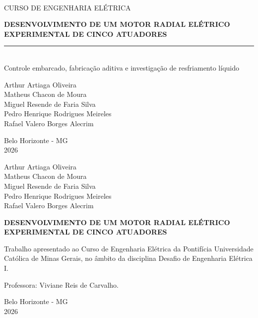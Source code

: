 \documentclass[12pt,a4paper,oneside]{article}
\begin{document}
\hypersetup{pageanchor=false}

\begin{titlepage}
  \pagecolor{navy}\color{white}
  \\[0.25cm]
  {\large CURSO DE ENGENHARIA ELÉTRICA}

  \vspace{3.2cm}
  {\fontsize{25}{31}\selectfont\bfseries
  DESENVOLVIMENTO DE UM MOTOR RADIAL ELÉTRICO EXPERIMENTAL DE CINCO ATUADORES\par}

  \vspace{0.8cm}
  {\color{orange}\rule{0.48\textwidth}{2.2pt}}\\[0.8cm]
  {\large Controle embarcado, fabricação aditiva e investigação de resfriamento líquido}

  \vfill
  {\normalsize
  Arthur Artiaga Oliveira\\
  Matheus Chacon de Moura\\
  Miguel Resende de Faria Silva\\
  Pedro Henrique Rodrigues Meireles\\
  Rafael Valero Borges Alecrim}

  \vspace{1.2cm}
  {\normalsize Belo Horizonte - MG\\2026}
\end{titlepage}
\nopagecolor\color{dark}

\begin{titlepage}
  \begin{center}
    {\normalsize
    Arthur Artiaga Oliveira\\
    Matheus Chacon de Moura\\
    Miguel Resende de Faria Silva\\
    Pedro Henrique Rodrigues Meireles\\
    Rafael Valero Borges Alecrim}

    \vspace{3.2cm}
    {\Large\bfseries DESENVOLVIMENTO DE UM MOTOR RADIAL ELÉTRICO EXPERIMENTAL DE CINCO ATUADORES\par}
  \end{center}

  \vspace{3.2cm}
  \hfill\begin{minipage}{0.52\textwidth}
    Trabalho apresentado ao Curso de Engenharia Elétrica da Pontifícia Universidade Católica de Minas Gerais, no âmbito da disciplina Desafio de Engenharia Elétrica I.

    \vspace{0.5cm}
    Professora: Viviane Reis de Carvalho.
  \end{minipage}

  \vfill
  \begin{center}
    Belo Horizonte - MG\\
    2026
  \end{center}
\end{titlepage}
\end{document}
